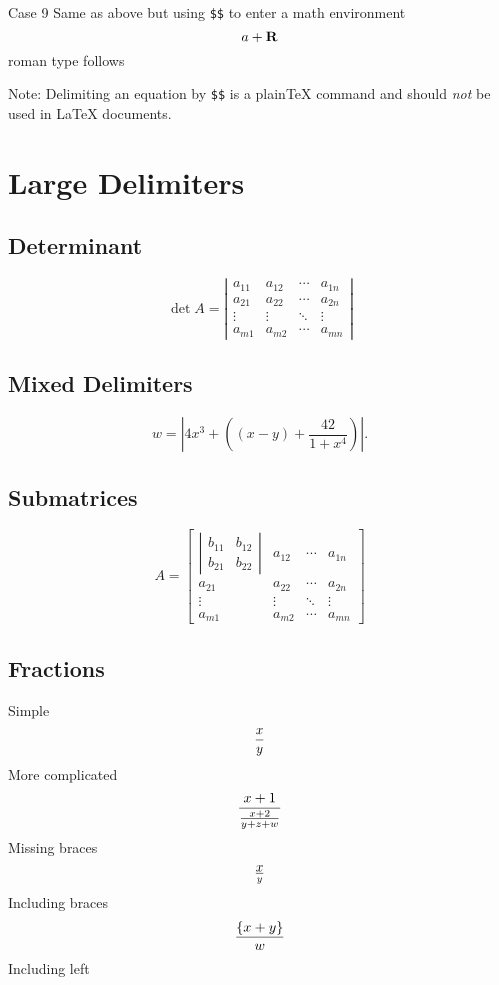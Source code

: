 \documentclass{article}
\begin{document}
Case 9 Same as above but using \verb#$$# to enter a math environment
$$a+ \bf R$$ roman type follows

Note: Delimiting an equation by \verb|$$| is a plain\TeX{} command and
should \emph{not} be used in \LaTeX{} documents.


\section{Large Delimiters}

\subsection{Determinant}

\[
\det A = \left| \begin{array}{cccc}
a_{11} & a_{12} & \cdots & a_{1n}\\
a_{21} & a_{22} & \cdots & a_{2n}\\
\vdots & \vdots & \ddots & \vdots\\
a_{m1} & a_{m2} & \cdots & a_{mn}
\end{array} \right|
\]

\subsection{Mixed Delimiters}
\[
w =  \left| 4 x^3 + \left( (x-y) + \frac{42}{1+x^4} \right) \right|.
\]

\subsection{Submatrices}
\[
A = \left[ \begin{array}{cccc}
\left|\begin{array}{cc}
b_{11}&b_{12}\\
b_{21}&b_{22}
\end{array}\right|
 & a_{12} & \cdots & a_{1n}\\
a_{21} & a_{22} & \cdots & a_{2n}\\
\vdots & \vdots & \ddots & \vdots\\
a_{m1} & a_{m2} & \cdots & a_{mn}
\end{array} \right]
\]

\subsection{Fractions}
Simple
\[
{x \over y}
\]
More complicated
\[
{x+1 \over {x+2 \over y+z +w}}
\]
Missing braces
\[
x \over y
\]
Including braces
\[
{\{ x+y \} \over w}
\]
Including left
\end{document}
